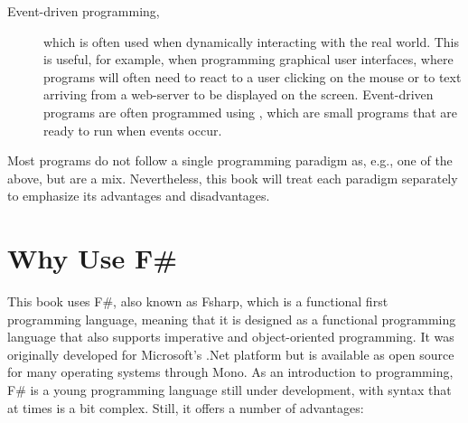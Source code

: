 \documentclass[springer.tex]{subfiles}
\begin{document}
\begin{description}
\item[Event-driven programming,] which is often used when dynamically interacting with the real world. This is useful, for example, when programming graphical user interfaces, where programs will often need to react to a user clicking on the mouse or to text arriving from a web-server to be displayed on the screen. Event-driven programs are often programmed using , which are small programs that are ready to run when events occur.
\end{description}
Most programs do not follow a single programming paradigm as, e.g., one of the above, but are a mix. Nevertheless, this book will treat each paradigm separately to emphasize its advantages and disadvantages.

\section{Why Use F\#}
This book uses F\#, also known as Fsharp, which is a functional first programming language, meaning that it is designed as a functional programming language that also supports imperative and object-oriented programming. It was originally developed for Microsoft's .Net platform but is available as open source for many operating systems through Mono. As an introduction to programming, F\# is a young programming language still under development, with syntax that at times is a bit complex. Still, it offers a number of advantages:
\end{document}
